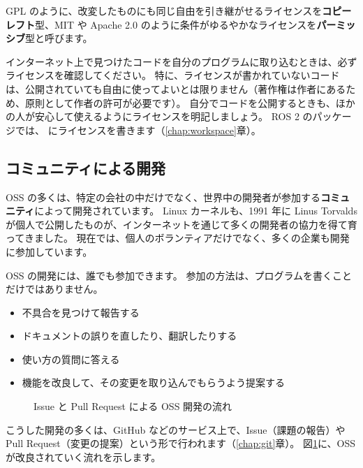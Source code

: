 GPL のように、改変したものにも同じ自由を引き継がせるライセンスを\textbf{コピーレフト}型、MIT や Apache 2.0 のように条件がゆるやかなライセンスを\textbf{パーミッシブ}型と呼びます。

\begin{caution}[他人のコードを使うときはライセンスを確認する]
  インターネット上で見つけたコードを自分のプログラムに取り込むときは、必ずライセンスを確認してください。
  特に、ライセンスが書かれていないコードは、公開されていても自由に使ってよいとは限りません（著作権は作者にあるため、原則として作者の許可が必要です）。
  自分でコードを公開するときも、ほかの人が安心して使えるようにライセンスを明記しましょう。
  ROS 2 のパッケージでは、 にライセンスを書きます（\ref{chap:workspace}章）。
\end{caution}

\subsection{コミュニティによる開発}

OSS の多くは、特定の会社の中だけでなく、世界中の開発者が参加する\textbf{コミュニティ}によって開発されています。
Linux カーネルも、1991 年に Linus Torvalds が個人で公開したものが、インターネットを通じて多くの開発者の協力を得て育ってきました。
現在では、個人のボランティアだけでなく、多くの企業も開発に参加しています。

OSS の開発には、誰でも参加できます。
参加の方法は、プログラムを書くことだけではありません。

\begin{itemize}
  \item 不具合を見つけて報告する
  \item ドキュメントの誤りを直したり、翻訳したりする
  \item 使い方の質問に答える
  \item 機能を改良して、その変更を取り込んでもらうよう提案する
\end{itemize}

\begin{figure}[tb]
  \centering
  
  \caption{Issue と Pull Request による OSS 開発の流れ}
  \label{fig:linux-oss-community}
\end{figure}

こうした開発の多くは、GitHub などのサービス上で、Issue（課題の報告）や Pull Request（変更の提案）という形で行われます（\ref{chap:git}章）。
図\ref{fig:linux-oss-community}に、OSS が改良されていく流れを示します。

